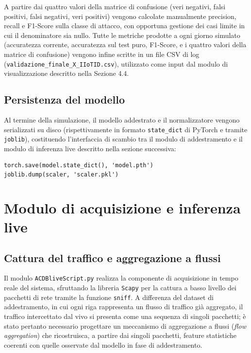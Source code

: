\documentclass[12pt,a4paper]{report}
\begin{document}
A partire dai quattro valori della matrice di confusione (veri negativi, falsi positivi, falsi negativi, veri positivi) vengono calcolate manualmente precision, recall e F1-Score sulla classe di attacco, con opportuna gestione dei casi limite in cui il denominatore sia nullo. Tutte le metriche prodotte a ogni giorno simulato (accuratezza corrente, accuratezza sul test puro, F1-Score, e i quattro valori della matrice di confusione) vengono infine scritte in un file CSV di log (\texttt{validazione\_finale\_X\_IIoTID.csv}), utilizzato come input dal modulo di visualizzazione descritto nella Sezione 4.4.

\subsection{Persistenza del modello}

Al termine della simulazione, il modello addestrato e il normalizzatore vengono serializzati su disco (rispettivamente in formato \texttt{state\_dict} di PyTorch e tramite \texttt{joblib}), costituendo l'interfaccia di scambio tra il modulo di addestramento e il modulo di inferenza live descritto nella sezione successiva:

\begin{lstlisting}[caption={Persistenza del modello e dello scaler (\texttt{validazioneACDBconEmbedding.py})}]
torch.save(model.state_dict(), 'model.pth')
joblib.dump(scaler, 'scaler.pkl')
\end{lstlisting}

\section{Modulo di acquisizione e inferenza live}

\subsection{Cattura del traffico e aggregazione a flussi}

Il modulo \texttt{ACDBliveScript.py} realizza la componente di acquisizione in tempo reale del sistema, sfruttando la libreria \texttt{Scapy} per la cattura a basso livello dei pacchetti di rete tramite la funzione \texttt{sniff}. A differenza del dataset di addestramento, in cui ogni riga rappresenta un flusso di traffico già aggregato, il traffico intercettato dal vivo si presenta come una sequenza di singoli pacchetti; è stato pertanto necessario progettare un meccanismo di aggregazione a flussi (\emph{flow aggregation}) che ricostruisca, a partire dai singoli pacchetti, feature statistiche coerenti con quelle osservate dal modello in fase di addestramento.
\end{document}
